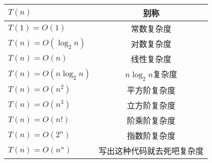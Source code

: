 \\[\intextsep]
    \begin{minipage}{\textwidth}
        \centering 
        \begin{tabular}{|l|c|}
            \hline
                $T(n)$ & 别称 \\
            \hline
                $T(1)=O(1)$ & 常数复杂度\\
                $T(n)=O(\log_{2}n)$ & 对数复杂度\\
                $T(n)=O(n)$ & 线性复杂度\\
                $T(n)=O(n\log_{2}n)$ & $n\log_{2}n$复杂度\\
                $T(n)=O(n^2)$ & 平方阶复杂度\\
                $T(n)=O(n^3)$ & 立方阶复杂度\\
                $T(n)=O(n!)$ & 阶乘阶复杂度\\
                $T(n)=O(2^n)$ & 指数阶复杂度\\
                $T(n)=O(n^n)$ & 写出这种代码就去死吧复杂度\\
            \hline
        \end{tabular}
        \label{tab:chap3-ATmega328P-Param} 
    \end{minipage}
\\[\intextsep] 